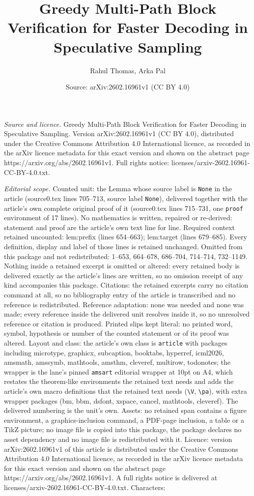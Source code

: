 \documentclass[10pt,a4paper]{amsart}
\title[Greedy Multi-Path Block Verification for Faster Decoding in ]{Greedy Multi-Path Block Verification for Faster Decoding in Speculative Sampling}
\author{Rahul Thomas, Arka Pal}
\date{Source: arXiv:2602.16961v1 (CC BY 4.0)}
\begin{document}
\maketitle

\noindent\emph{Source and licence.} Greedy Multi-Path Block Verification for Faster Decoding in Speculative Sampling. Version arXiv:2602.16961v1 (CC BY 4.0), distributed under the Creative Commons Attribution 4.0 International licence, as recorded in the arXiv licence metadata for this exact version and shown on the abstract page https://arxiv.org/abs/2602.16961v1. Full rights notice: licenses/arxiv-2602.16961-CC-BY-4.0.txt.\par\smallskip

\noindent\textit{Editorial scope.} Counted unit: the Lemma whose source label is \texttt{None} in the article (source0.tex lines 705--713, source label \texttt{None}), delivered together with the article's own complete original proof of it (source0.tex lines 715--731, one \texttt{proof} environment of 17 lines). No mathematics is written, repaired or re-derived: statement and proof are the article's own text line for line. Required context retained uncounted: lem:prefix (lines 654--663); lem:target (lines 679--685). Every definition, display and label of those lines is retained unchanged. Omitted from this package and not redistributed: 1--653, 664--678, 686--704, 714--714, 732--1149. Nothing inside a retained excerpt is omitted or altered: every retained body is delivered exactly as the article's lines are written, so no omission receipt of any kind accompanies this package. Citations: the retained excerpts carry no citation command at all, so no bibliography entry of the article is transcribed and no reference is redistributed. Reference adaptation: none was needed and none was made; every reference inside the delivered unit resolves inside it, so no unresolved reference or citation is produced. Printed slips kept literal: no printed word, symbol, hypothesis or number of the counted statement or of its proof was altered. Layout and class: the article's own class is \texttt{article} with packages including microtype, graphicx, subcaption, booktabs, hyperref, icml2026, amsmath, amssymb, mathtools, amsthm, cleveref, multirow, todonotes; the wrapper is the lane's pinned \texttt{amsart} editorial wrapper at 10pt on A4, which restates the theorem-like environments the retained text needs and adds the article's own macro definitions that the retained text needs (\texttt{\textbackslash V}, \texttt{\textbackslash pa}), with extra wrapper packages (bm, bbm, dsfont, xspace, cancel, mathtools, cleveref). The delivered numbering is the unit's own. Assets: no retained span contains a figure environment, a graphics-inclusion command, a PDF-page inclusion, a table or a TikZ picture; no image file is copied into this package, the package declares no asset dependency and no image file is redistributed with it. Licence: version arXiv:2602.16961v1 of this article is distributed under the Creative Commons Attribution 4.0 International licence, as recorded in the arXiv licence metadata for this exact version and shown on the abstract page https://arxiv.org/abs/2602.16961v1. A full rights notice is delivered at licenses/arxiv-2602.16961-CC-BY-4.0.txt. Characters: 
\end{document}

